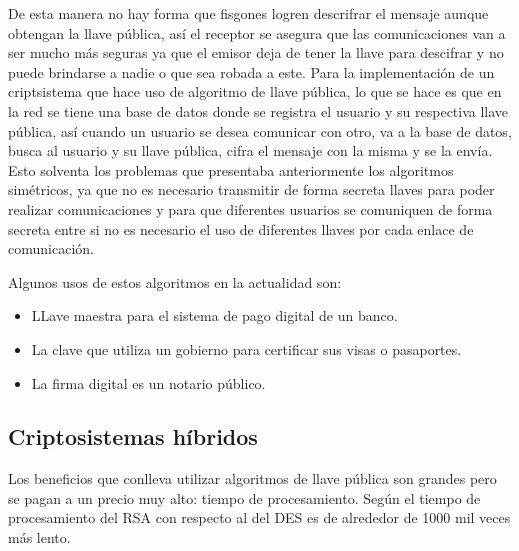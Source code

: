 De esta manera no hay forma que fisgones logren descrifrar el mensaje aunque obtengan la llave pública, así el receptor se asegura que las comunicaciones van a ser mucho más seguras ya que el emisor deja de tener la llave para descifrar y no puede brindarse a nadie o que sea robada a este. Para la implementación de un criptsistema que hace uso de algoritmo de llave pública, lo que se hace es que en la red se tiene una base de datos donde se registra el usuario y su respectiva llave pública, así cuando un usuario se desea comunicar con otro, va a la base de datos, busca al usuario y su llave pública, cifra el mensaje con la misma y se la envía. Esto solventa los problemas que presentaba anteriormente los algoritmos simétricos, ya que no es necesario transmitir de forma secreta llaves para poder realizar comunicaciones y para que diferentes usuarios se comuniquen de forma secreta entre si no es necesario el uso de diferentes llaves por cada enlace de comunicación. 

Algunos usos de estos algoritmos en la actualidad son:
\begin{itemize}
\item LLave maestra para el sistema de pago digital de un banco.
\item La clave que utiliza un gobierno para certificar sus visas o pasaportes.
\item La firma digital es un notario público.
\end{itemize} 

\subsection{Criptosistemas híbridos}
Los beneficios que conlleva utilizar algoritmos de llave pública son grandes pero se pagan a un precio muy alto: tiempo de procesamiento. Según \cite{bruce} el tiempo de procesamiento del RSA con respecto al del DES es de alrededor de 1000 mil veces más lento. 

